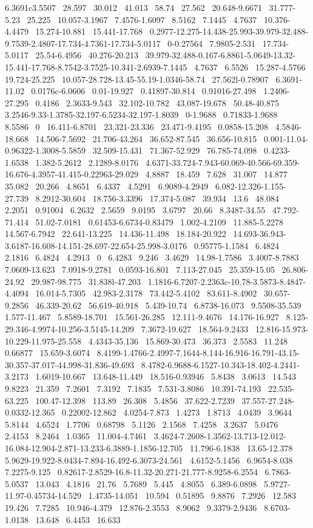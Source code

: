 \documentclass{article}
\begin{document}
6.3691c3.5507~ 28.597~ 30.012~ 41.013~ 58.74~ 27.562~ 20.648-9.6671~ 31.777-5.23~ 25.225~ 10.057-3.1967~ 7.4576-1.6097~ 8.5162~ 7.1445~ 4.7637~ 10.376-4.4479~ 15.274-10.881~ 15.441-17.768~ 0.2977-12.275-14.438-25.993-39.979-32.488-9.7539-2.4807-17.734-4.7361-17.734-5.0117~ 0-0.27564~ 7.9805-2.531~ 17.734-5.0117~ 25.54-6.4956~ 40.276-20.213~ 39.979-32.488-0.167-6.8861-5.0649-13.32-15.441-17.768-8.7542-3.7525-10.341-2.6939-7.1445~ 4.7637~ 6.5526~ 15.287-4.5766~ 19.724-25.225~ 10.057-28.728-13.45-55.19-1.0346-58.74~ 27.562l-0.78907~ 6.3691-11.02~ 0.0176c-6.0606~ 0.01-19.927~ 0.41897-30.814~ 0.91016-27.498~ 1.2406-27.295~ 0.4186~ 2.3633-9.543~ 32.102-10.782~ 43.087-19.678~ 50.48-40.875~ 3.2546-9.33-1.3785-32.197-6.5234-32.197-1.8039~ 0-1.9688~ 0.71833-1.9688~ 8.5586~ 0~ 16.411-6.8701~ 23.321-23.336~ 23.471-9.4195~ 0.0858-15.208~ 4.5846-18.668~ 14.506-7.5692~ 21.706-43.264~ 36.652-87.545~ 36.656-10.815~ 0.001-11.04-0.96322-1.3008-5.5859~ 32.509-15.431~ 71.367-52.929~ 76.785-74.098~ 0.4233-1.6538~ 1.382-5.2612~ 2.1289-8.0176~ 4.6371-33.724-7.943-60.069-40.566-69.359-16.676-4.3957-41.415-0.22963-29.029~ 4.8887~ 18.459~ 7.628~ 31.007~ 14.877~ 35.082~ 20.266~ 4.8651~ 6.4337~ 4.5291~ 6.9089-4.2949~ 6.082-12.326-1.155-27.739~ 8.2912-30.604~ 18.756-3.3396~ 17.374-5.087~ 39.934~ 13.6~ 48.084~ 2.2051~ 0.91004~ 6.2632~ 2.5659~ 9.0195~ 3.6797~ 20.66~ 8.3487-34.55~ 47.792-71.414~ 51.02-7.0181~ 0.61453-6.6734-0.83479~ 1.002-4.2109~ 11.885-5.2278~ 14.567-6.7942~ 22.641-13.225~ 14.436-11.498~ 18.184-20.922~ 14.693-36.943-3.6187-16.608-14.151-28.697-22.654-25.998-3.0176~ 0.95775-1.1584~ 6.4824~ 2.1816~ 6.4824~ 4.2913~ 0~ 6.4283~ 9.246~ 3.4629~ 14.98-1.7586~ 3.4007-8.7883~ 7.0609-13.623~ 7.0918-9.2781~ 0.0593-16.801~ 7.113-27.045~ 25.359-15.05~ 26.806-24.92~ 29.987-98.775~ 31.838l-47.203~ 1.1816-6.7207-2.2363c-10.78-3.5873-8.4847-4.4094~ 16.014-5.7305~ 42.983-2.3178~ 73.442-5.4102~ 83.611-8.4902~ 30.657-9.2856~ 46.339-20.62~ 56.619-40.918~ 5.439-10.74~ 6.8738-16.073~ 9.5508-35.539~ 1.577-11.467~ 5.8589-18.701~ 15.561-26.285~ 12.111-9.4676~ 14.176-16.927~ 8.125-29.346-4.9974-10.256-3.5145-14.209~ 7.3672-19.627~ 18.564-9.2433~ 12.816-15.973-10.229-11.975-25.558~ 4.4343-35.136~ 15.869-30.473~ 36.373~ 2.5583~ 11.248~ 0.66877~ 15.659-3.6074~ 8.4199-1.4766-2.4997-7.1644-8.144-16.916-16.791-43.15-30.357-37.017-44.998-31.836-49.693~ 8.4782-6.9688-6.1527-10.343-18.402-4.2441-3.2173~ 1.6019-10.667~ 13.648-11.449~ 18.516-0.93946~ 5.8438~ 3.0613~ 14.543~ 9.8223~ 21.359~ 7.2601~ 7.3192~ 7.1835~ 7.531-3.8086~ 10.391-74.193~ 22.535-63.225~ 100.47-12.398~ 113.89~ 26.308~ 5.4856~ 37.622-2.7239~ 37.557-27.248-0.0332-12.365~ 0.22002-12.862~ 4.0254-7.873~ 1.4273~ 1.8713~ 4.0439~ 3.9644~ 5.8144~ 4.6524~ 1.7706~ 0.68798~ 5.1126~ 2.1568~ 7.4258~ 3.2637~ 5.0476~ 2.4153~ 8.2464~ 1.0365~ 11.004-4.7461~ 3.4624-7.2608-1.3562-13.713-12.012-16.084-12.904-2.871-13.233-6.3889-1.1856-12.705~ 11.796-6.1838~ 13.65-12.378~ 5.9629-19.922-8.0434-7.894-16.492-6.3073-24.561~ 4.6152-5.1456~ 6.9654-8.038~ 7.2275-9.125~ 0.82617-2.8529-16.8-11.32-20.271-21.777-8.9258-6.2554~ 6.7863-5.0537~ 13.043~ 4.1816~ 21.76~ 5.7689~ 5.445~ 4.8055~ 6.389-6.0898~ 5.9727-11.97-0.45734-14.529~ 1.4735-14.051~ 10.594~ 0.51895~ 9.8876~ 7.2926~ 12.583~ 19.426~ 7.7285~ 10.946-4.379~ 12.876-2.3553~ 8.9062~ 9.3379-2.9436~ 8.6703-1.0138~ 13.648~ 6.4453~ 16.633~ 
\end{document}
